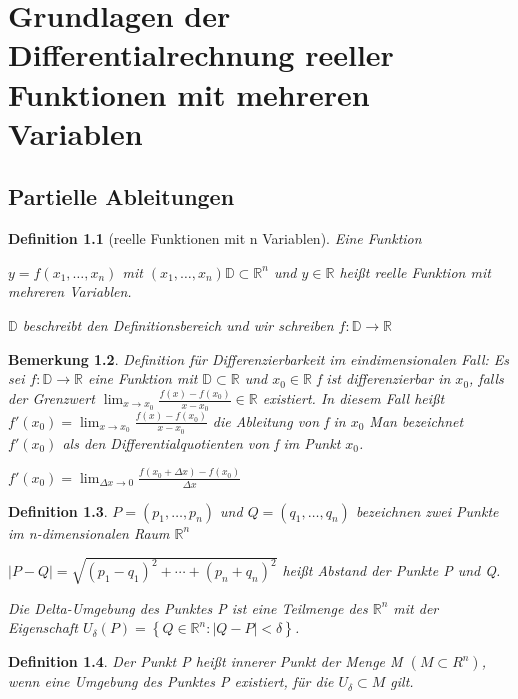 \documentclass[fontset=ubuntu,12pt,a4paper]{scrreprt}
\newtheorem{defi}{Definition}[section]
\newtheorem{bemerkung}[defi]{Bemerkung}
\begin{document}
    
    \tableofcontents

    \chapter{Grundlagen der Differentialrechnung reeller Funktionen mit mehreren Variablen}
    
    \section{Partielle Ableitungen}
    
    \begin{defi}[reelle Funktionen mit n Variablen]
        Eine Funktion 
        
        \(y = f(x_1, \dots, x_n)\) mit \(\left(x_1, \dots, x_n\right) \mathbb{D} \subset \mathbb{R}^n\) und \(y \in \mathbb{R}\) heißt reelle Funktion mit mehreren Variablen.

        \(\mathbb{D}\) beschreibt den Definitionsbereich und wir schreiben \(f:\mathbb{D} \to \mathbb{R}\)
    \end{defi}

\begin{bemerkung}
    Definition für Differenzierbarkeit im eindimensionalen Fall:
    Es sei \(f : \mathbb{D} \to \mathbb{R}\) eine Funktion mit \(\mathbb{D} \subset \mathbb{R}\) und \(x_0 \in \mathbb{R}\)
    f ist differenzierbar in \(x_0\), falls der Grenzwert \(\lim_{x\to x_0} {\frac{f\left(x\right) - f\left(x_0\right)}{x-x_0}} \in \mathbb{R}\) existiert.
    In diesem Fall heißt \(f'\left(x_0\right) = \lim_{x\to x_0}{\frac{f\left(x\right) - f\left(x_0\right)}{x-x_0}}\) die Ableitung von f in \(x_0\)
    Man bezeichnet \(f'\left(x_0\right)\) als den Differentialquotienten von f im Punkt \(x_0\).
    
    \(f'\left(x_0\right) = \lim_{\Delta x\to0}{\frac{f\left(x_0 + \Delta x\right) - f\left(x_0\right)}{\Delta x}}\)
    
\end{bemerkung}

\begin{defi}
    \(P=(p_1,\ldots,p_n)\) und \(Q=(q_1,\ldots,q_n)\) bezeichnen zwei Punkte im n-dimensionalen Raum \(\mathbb{R}^n\)
    
    \(\left|P-Q\right|=\sqrt{{\left(p_1-q_1\right)}^2 + \cdots + {\left(p_n+q_n\right)}^2}\) heißt Abstand der Punkte P und Q.
    
    Die Delta-Umgebung des Punktes P ist eine Teilmenge des \(\mathbb{R}^n\) mit der Eigenschaft \(U_\delta\left(P\right)=\left\{Q\in\mathbb{R}^n:\left|Q-P\right|<\delta\right\}\).
    
\end{defi}
    \begin{defi}
        Der Punkt P heißt innerer Punkt der Menge M \((M \subset R^n)\), wenn eine Umgebung des Punktes P existiert, für die \(U_\delta \subset M\) gilt.
    \end{defi}
\end{document}
